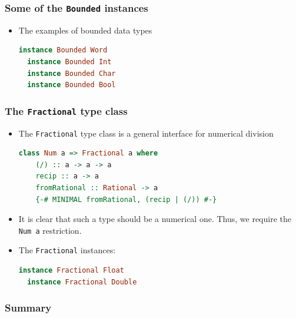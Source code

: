 \documentclass[10pt,pdf,utf8,russian,aspectratio=169]{beamer}
\begin{document}
\begin{frame}[fragile]
  \frametitle{Some of the \verb"Bounded" instances}
\begin{itemize}
  \item The examples of bounded data types
\begin{lstlisting}[language=Haskell]
  instance Bounded Word
  instance Bounded Int
  instance Bounded Char
  instance Bounded Bool
\end{lstlisting}
\end{itemize}
\end{frame}

\begin{frame}[fragile]
  \frametitle{The \verb"Fractional" type class}

\begin{itemize}
  \item The \verb"Fractional" type class is a general interface for numerical division
\begin{lstlisting}[language=Haskell]
  class Num a => Fractional a where
    (/) :: a -> a -> a
    recip :: a -> a
    fromRational :: Rational -> a
    {-# MINIMAL fromRational, (recip | (/)) #-}
  \end{lstlisting}
  \item It is clear that such a type should be a numerical one. Thus, we require the \verb"Num a" restriction.
  \item The \verb"Fractional" instances:
  \begin{lstlisting}[language=Haskell]
  instance Fractional Float
  instance Fractional Double
  \end{lstlisting}
\end{itemize}
\end{frame}

\begin{frame}
  \frametitle{Summary}


\end{frame}
\end{document}
